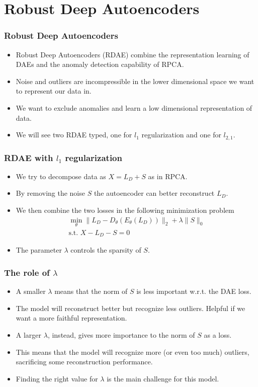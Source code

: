 \documentclass{beamer}
\theoremstyle{plain}
\theoremstyle{definition}
\theoremstyle{remark}
\newcommand{\norm}[1]{\lVert#1\rVert}
\begin{document}
\section{Robust Deep Autoencoders}

\begin{frame}
	\frametitle{Robust Deep Autoencoders}
	\begin{itemize}
		\item Robust Deep Autoencoders (RDAE) combine the representation learning of DAEs and the anomaly detection capability of RPCA.
		\item Noise and outliers are incompressible in the lower dimensional space we want to represent our data in.
		\item We want to exclude anomalies and learn a low dimensional representation of data.
		\item We will see two RDAE typed, one for $l_1$ regularization and one for $l_{2,1}$.
	\end{itemize}
\end{frame}

\begin{frame}
	\frametitle{RDAE with $l_1$ regularization}
	\begin{itemize}
		\item We try to decompose data as $X=L_D+S$ as in RPCA.
		\item By removing the noise $S$ the autoencoder can better reconstruct $L_D$.
		\item We then combine the two losses in the following minimization problem
			\begin{align}
				\min_{\theta}{\norm{L_D -D_{\theta}(E_{\theta}(L_D))}_2 + \lambda\norm{S}_0}\\
				\text{s.t. }X-L_D-S=0  
			\end{align}
		\item The parameter $\lambda$ controls the sparsity of $S$.
	\end{itemize}
\end{frame}

\begin{frame}
	\frametitle{The role of $\lambda$}
	\begin{itemize}
		\item A smaller $\lambda$ means that the norm of $S$ is less important w.r.t. the DAE loss.
		\item The model will reconstruct better but recognize less outliers. Helpful if we want a more faithful representation.
		\item A larger $\lambda$, instead, gives more importance to the norm of $S$ as a loss.
		\item This means that the model will recognize more (or even too much) outliers, sacrificing some reconstruction performance.
		\item Finding the right value for $\lambda$ is the main challenge for this model.
	\end{itemize}
\end{frame}
\end{document}
